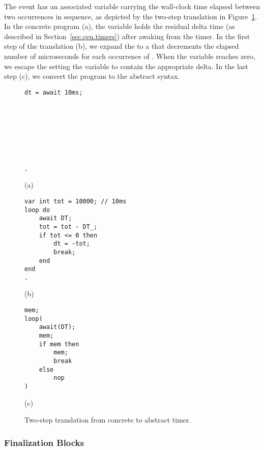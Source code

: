 The event  has an associated variable  carrying the 
wall-clock time elapsed between two occurrences in sequence, as depicted by the 
two-step translation in Figure~\ref{lst.map.timers.2}.
In the concrete program (a), the variable  holds the residual delta 
time (as described in Section~\ref{sec.ceu.timers}) after awaking from the 
timer.
In the first step of the translation (b), we expand the  to a 
 that decrements the elapsed number of microseconds for each 
occurrence of .
When the variable  reaches zero, we escape the  setting 
the variable  to contain the appropriate delta.
In the last step (c), we convert the program to the abstract syntax.

\begin{figure}
\begin{minipage}[t]{0.30\linewidth}
\begin{lstlisting}
dt = await 10ms;








.
\end{lstlisting}
\centering\small{(a)}
\end{minipage}
%
\begin{minipage}[t]{0.37\linewidth}
\begin{lstlisting}
var int tot = 10000; // 10ms
loop do
    await DT;
    tot = tot - DT_;
    if tot <= 0 then
        dt = -tot;
        break;
    end
end
.
\end{lstlisting}
\centering\small{(b)}
\end{minipage}
%
\begin{minipage}[t]{0.30\linewidth}
\begin{lstlisting}
mem;
loop(
    await(DT);
    mem;
    if mem then
        mem;
        break
    else
        nop
)
\end{lstlisting}
\centering\small{(c)}
\end{minipage}
\caption{
Two-step translation from concrete to abstract timer.
\label{lst.map.timers.2}
}
\end{figure}

\subsubsection{Finalization Blocks}
\label{sec.formal.fins}

